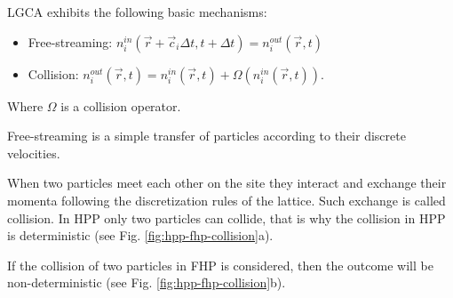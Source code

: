 LGCA exhibits the following basic mechanisms:

\begin{itemize}
\item Free-streaming: $ n_i^{in}(\vec{r}+\vec{c}_{i}\Delta t, t+\Delta t) = n_i^{out}(\vec{r}, t) $
\item Collision: $ n_i^{out}(\vec{r}, t) = n_i^{in}(\vec{r}, t) + \Omega(n_i^{in}(\vec{r}, t)) $.
\end{itemize}
Where $\Omega$ is a collision operator.

Free-streaming is a simple transfer of particles according to their discrete velocities.

When two particles meet each other on the site they interact and exchange their momenta following the discretization rules of the lattice. Such exchange is called collision. In HPP only two particles can collide, that is why the collision in HPP is deterministic (see Fig. \ref{fig:hpp-fhp-collision}a).

If  the collision of two particles in FHP is considered, then the outcome will be non-deterministic (see Fig. \ref{fig:hpp-fhp-collision}b).

